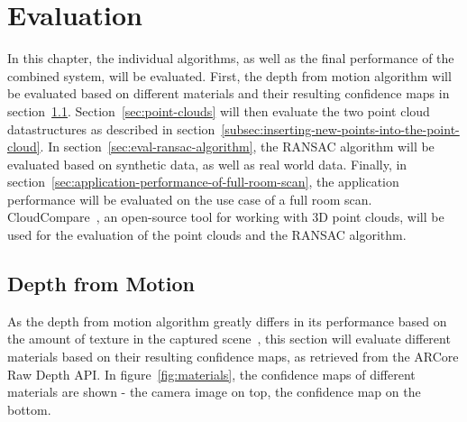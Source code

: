 \chapter{Evaluation}\label{ch:evaluation}
In this chapter, the individual algorithms, as well as the final performance of the combined system, will be evaluated.
First, the depth from motion algorithm will be evaluated based on different materials and their resulting confidence maps in section~\ref{sec:eval-depth-from-motion}.
Section~\ref{sec:point-clouds} will then evaluate the two point cloud datastructures as described in section~\ref{subsec:inserting-new-points-into-the-point-cloud}.
In section~\ref{sec:eval-ransac-algorithm}, the RANSAC algorithm will be evaluated based on synthetic data, as well as real world data.
Finally, in section~\ref{sec:application-performance-of-full-room-scan}, the application performance will be evaluated on the use case of a full room scan.
CloudCompare~\cite{daniel_girardeau-montaut_cloudcompare_nodate}, an open-source tool for working with 3D point clouds, will be used for the evaluation of the point clouds and the RANSAC algorithm.

\section{Depth from Motion}\label{sec:eval-depth-from-motion}
As the depth from motion algorithm greatly differs in its performance based on the amount of texture in the captured scene~\cite{google_llc_arcore_doc},
this section will evaluate different materials based on their resulting confidence maps, as retrieved from the ARCore Raw Depth API\@.
In figure~\ref{fig:materials}, the confidence maps of different materials are shown - the camera image on top, the confidence map on the bottom.

